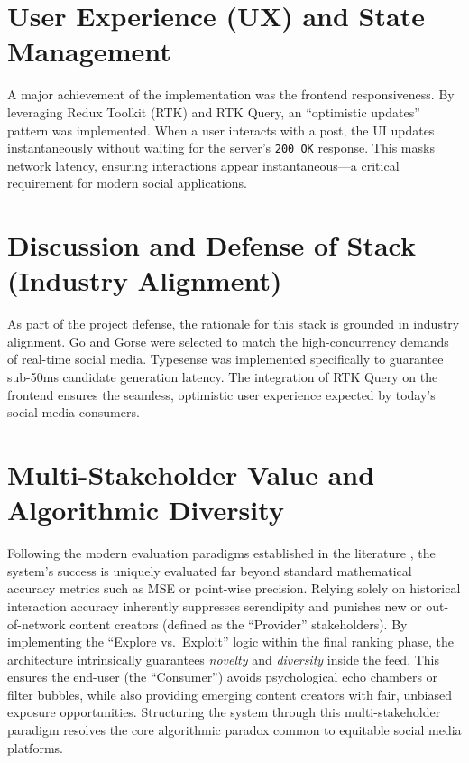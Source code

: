 \section{User Experience (UX) and State Management}
A major achievement of the implementation was the frontend responsiveness. By leveraging Redux Toolkit (RTK) and RTK Query, an ``optimistic updates'' pattern was implemented. When a user interacts with a post, the UI updates instantaneously without waiting for the server's \texttt{200 OK} response. This masks network latency, ensuring interactions appear instantaneous---a critical requirement for modern social applications.

\section{Discussion and Defense of Stack (Industry Alignment)}
As part of the project defense, the rationale for this stack is grounded in industry alignment. Go and Gorse were selected to match the high-concurrency demands of real-time social media. Typesense was implemented specifically to guarantee sub-50ms candidate generation latency. The integration of RTK Query on the frontend ensures the seamless, optimistic user experience expected by today's social media consumers.

\section{Multi-Stakeholder Value and Algorithmic Diversity}
Following the modern evaluation paradigms established in the literature \cite{ricci2022}, the system's success is uniquely evaluated far beyond standard mathematical accuracy metrics such as MSE or point-wise precision. Relying solely on historical interaction accuracy inherently suppresses serendipity and punishes new or out-of-network content creators (defined as the ``Provider'' stakeholders). By implementing the ``Explore vs.\ Exploit'' logic within the final ranking phase, the architecture intrinsically guarantees \textit{novelty} and \textit{diversity} inside the feed. This ensures the end-user (the ``Consumer'') avoids psychological echo chambers or filter bubbles, while also providing emerging content creators with fair, unbiased exposure opportunities. Structuring the system through this multi-stakeholder paradigm resolves the core algorithmic paradox common to equitable social media platforms.
